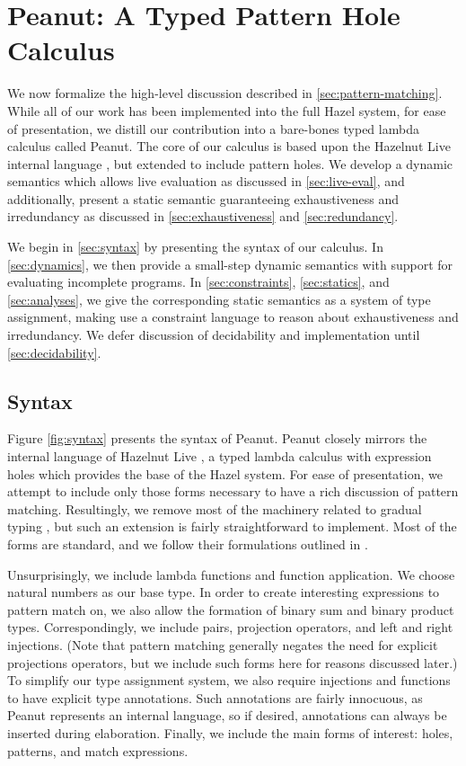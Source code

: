 \section{Peanut: A Typed Pattern Hole Calculus}\label{sec:peanut}
We now formalize the high-level discussion described in \autoref{sec:pattern-matching}. While all of our work has been implemented into the full Hazel system, for ease of presentation, we distill our contribution into a bare-bones typed lambda calculus called Peanut. The core of our calculus is based upon the Hazelnut Live internal language \cite{DBLP:journals/pacmpl/OmarVCH19}, but extended to include pattern holes. We develop a dynamic semantics which allows live evaluation as discussed in \autoref{sec:live-eval}, and additionally, present a static semantic guaranteeing exhaustiveness and irredundancy as discussed in \autoref{sec:exhaustiveness} and \autoref{sec:redundancy}. 

We begin in \autoref{sec:syntax} by presenting the syntax of our calculus. In \autoref{sec:dynamics}, we then provide a small-step dynamic semantics with support for evaluating incomplete programs. In \autoref{sec:constraints}, \autoref{sec:statics}, and \autoref{sec:analyses}, we give the corresponding static semantics as a system of type assignment, making use a constraint language to reason about exhaustiveness and irredundancy. We defer discussion of decidability and implementation until \autoref{sec:decidability}.

\subsection{Syntax}\label{sec:syntax}



Figure \ref{fig:syntax} presents the syntax of Peanut. Peanut closely mirrors the internal language of Hazelnut Live \cite{DBLP:journals/pacmpl/OmarVCH19}, a typed lambda calculus with expression holes which provides the base of the Hazel system. For ease of presentation, we attempt to include only those forms necessary to have a rich discussion of pattern matching. Resultingly, we remove most of the machinery related to gradual typing \cite{DBLP:conf/snapl/SiekVCB15}, but such an extension is fairly straightforward to implement. Most of the forms are standard, and we follow their formulations outlined in \cite{Harper2012}. 

Unsurprisingly, we include lambda functions and function application. We choose natural numbers as our base type. In order to create interesting expressions to pattern match on, we also allow the formation of binary sum and binary product types. Correspondingly, we include pairs, projection operators, and left and right injections. (Note that pattern matching generally negates the need for explicit projections operators, but we include such forms here for reasons discussed later.) To simplify our type assignment system, we also require injections and functions to have explicit type annotations. Such annotations are fairly innocuous, as Peanut represents an internal language, so if desired, annotations can always be inserted during elaboration. Finally, we include the main forms of interest: holes, patterns, and match expressions.


